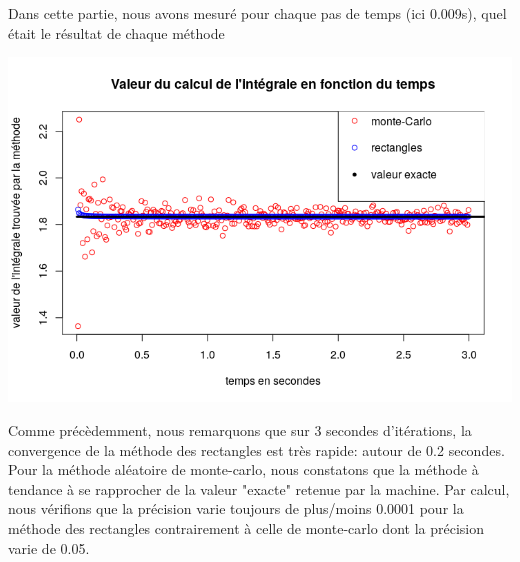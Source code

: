 \documentclass[a4paper,10pt]{article}
\begin{document}
\vspace{1mm}
\noindent
{}
\vspace{1mm}

Dans cette partie, nous avons mesuré pour chaque pas de temps (ici 0.009s), quel était le résultat de chaque méthode
\begin{minipage}{0.5\textwidth}
\begin{flushleft}
      \includegraphics[scale=0.5]{fig/precision_temps.png}
\end{flushleft}
\end{minipage}
\hspace{1cm}
\begin{minipage}{0.45\textwidth}
	Comme précèdemment, nous remarquons que sur 3 secondes d'itérations, la convergence de la méthode des rectangles est très rapide: autour de 0.2 secondes. Pour la méthode aléatoire de monte-carlo, nous constatons que la méthode à tendance à se rapprocher de la valeur "exacte" retenue par la machine. Par calcul, nous vérifions que la précision varie toujours de plus/moins 0.0001 pour la méthode des rectangles contrairement à celle de monte-carlo dont la précision varie de 0.05.


\end{minipage}
\end{document}
